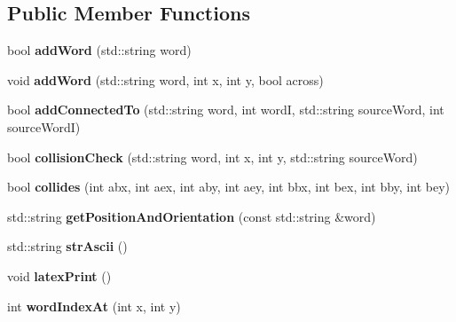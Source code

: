 \subsection*{Public Member Functions}
\begin{DoxyCompactItemize}
\item 
bool {\bfseries add\+Word} (std\+::string word)\hypertarget{classCrossword_a8cd860c8c44d1b97e7667defb8a867ec}{}\label{classCrossword_a8cd860c8c44d1b97e7667defb8a867ec}

\item 
void {\bfseries add\+Word} (std\+::string word, int x, int y, bool across)\hypertarget{classCrossword_a264f80b2b16dc6ed81f8fcdb6668412a}{}\label{classCrossword_a264f80b2b16dc6ed81f8fcdb6668412a}

\item 
bool {\bfseries add\+Connected\+To} (std\+::string word, int wordI, std\+::string source\+Word, int source\+WordI)\hypertarget{classCrossword_aeb76f7a07b1dce37bcdb4f4c34d68096}{}\label{classCrossword_aeb76f7a07b1dce37bcdb4f4c34d68096}

\item 
bool {\bfseries collision\+Check} (std\+::string word, int x, int y, std\+::string source\+Word)\hypertarget{classCrossword_adffaf355b0ce0df1950aaf854df752db}{}\label{classCrossword_adffaf355b0ce0df1950aaf854df752db}

\item 
bool {\bfseries collides} (int abx, int aex, int aby, int aey, int bbx, int bex, int bby, int bey)\hypertarget{classCrossword_a3a7f13cd35e005add4e010c09ae47087}{}\label{classCrossword_a3a7f13cd35e005add4e010c09ae47087}

\item 
std\+::string {\bfseries get\+Position\+And\+Orientation} (const std\+::string \&word)\hypertarget{classCrossword_a9254e77677c936f3eb07baca7268f0f7}{}\label{classCrossword_a9254e77677c936f3eb07baca7268f0f7}

\item 
std\+::string {\bfseries str\+Ascii} ()\hypertarget{classCrossword_a9345fdb4c29eac51e4e2c3881d57f380}{}\label{classCrossword_a9345fdb4c29eac51e4e2c3881d57f380}

\item 
void {\bfseries latex\+Print} ()\hypertarget{classCrossword_a3f3b79bf83ea9bff5781214255a7576b}{}\label{classCrossword_a3f3b79bf83ea9bff5781214255a7576b}

\item 
int {\bfseries word\+Index\+At} (int x, int y)\hypertarget{classCrossword_a9072708ab5ecdae34bf8d6c7c5d3e65e}{}\label{classCrossword_a9072708ab5ecdae34bf8d6c7c5d3e65e}


\end{DoxyCompactItemize}
